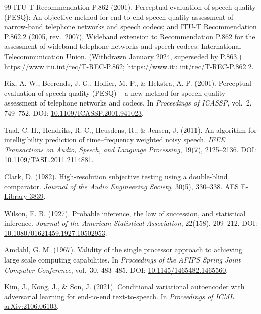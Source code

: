 \documentclass[11pt,a4paper]{article}
\begin{document}
\begin{thebibliography}{99}
ITU-T Recommendation P.862 (2001), Perceptual evaluation of speech quality (PESQ): An objective method for end-to-end speech quality assessment of narrow-band telephone networks and speech codecs; and ITU-T Recommendation P.862.2 (2005, rev.\ 2007), Wideband extension to Recommendation P.862 for the assessment of wideband telephone networks and speech codecs.
International Telecommunication Union. (Withdrawn January 2024, superseded by P.863.)
\url{https://www.itu.int/rec/T-REC-P.862}; \url{https://www.itu.int/rec/T-REC-P.862.2}.

Rix, A. W., Beerends, J. G., Hollier, M. P., \& Hekstra, A. P. (2001).
Perceptual evaluation of speech quality (PESQ) -- a new method for speech quality assessment of telephone networks and codecs.
In \textit{Proceedings of ICASSP}, vol.\ 2, 749--752.
DOI: \href{https://doi.org/10.1109/ICASSP.2001.941023}{10.1109/ICASSP.2001.941023}.

Taal, C. H., Hendriks, R. C., Heusdens, R., \& Jensen, J. (2011).
An algorithm for intelligibility prediction of time--frequency weighted noisy speech.
\textit{IEEE Transactions on Audio, Speech, and Language Processing}, 19(7), 2125--2136.
DOI: \href{https://doi.org/10.1109/TASL.2011.2114881}{10.1109/TASL.2011.2114881}.

Clark, D. (1982).
High-resolution subjective testing using a double-blind comparator.
\textit{Journal of the Audio Engineering Society}, 30(5), 330--338.
\href{https://aes.org/publications/elibrary-page/?id=3839}{AES E-Library 3839}.

Wilson, E. B. (1927).
Probable inference, the law of succession, and statistical inference.
\textit{Journal of the American Statistical Association}, 22(158), 209--212.
DOI: \href{https://doi.org/10.1080/01621459.1927.10502953}{10.1080/01621459.1927.10502953}.

Amdahl, G. M. (1967).
Validity of the single processor approach to achieving large scale computing capabilities.
In \textit{Proceedings of the AFIPS Spring Joint Computer Conference}, vol.\ 30, 483--485.
DOI: \href{https://doi.org/10.1145/1465482.1465560}{10.1145/1465482.1465560}.

Kim, J., Kong, J., \& Son, J. (2021).
Conditional variational autoencoder with adversarial learning for end-to-end text-to-speech.
In \textit{Proceedings of ICML}.
\href{https://arxiv.org/abs/2106.06103}{arXiv:2106.06103}.


\end{thebibliography}
\end{document}

